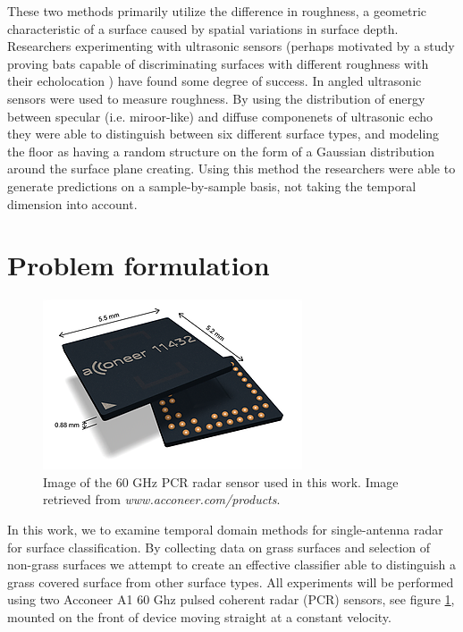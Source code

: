 \indent These two methods primarily utilize the difference in roughness, a geometric characteristic of a surface caused by spatial variations in surface depth. Researchers experimenting with ultrasonic sensors (perhaps motivated by a study proving bats capable of discriminating surfaces with different roughness with their echolocation \citep{schmidt_1988}) have found some degree of success. In \citep{politis_probert_1999} angled ultrasonic sensors were used to measure roughness. By using the distribution of energy between specular (i.e. miroor-like) and diffuse componenets of ultrasonic echo they were able to distinguish between six different surface types, and modeling the floor as having a random structure on the form of a Gaussian distribution around the surface plane creating. Using this method the researchers were able to generate predictions on a sample-by-sample basis, not taking the temporal dimension into account.
\section{Problem formulation}

\begin{figure}
	\centering
	\includegraphics[scale=0.8]{figs_temp/acc_sensor}
	\caption{Image of the 60 GHz PCR radar sensor used in this work. Image retrieved from \emph{www.acconeer.com/products}.}
	\label{fig:acc_sens}
\end{figure}


In this work, we to examine temporal domain methods for single-antenna radar for surface classification. By collecting data on grass surfaces and selection of non-grass surfaces we attempt to create an effective classifier able to distinguish a grass covered surface from other surface types. All experiments will be performed using two Acconeer A1 60 Ghz pulsed coherent radar (PCR) sensors, see figure \ref{fig:acc_sens},  mounted on the front of device moving straight at a constant velocity. 

